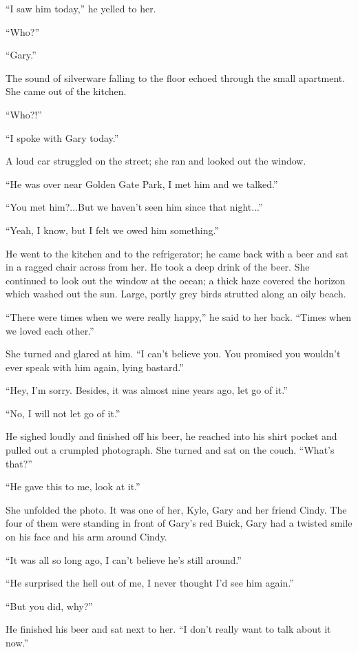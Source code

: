 \documentclass[
]{article}
\begin{document}
``I saw him today,'' he yelled to her.

``Who?''

``Gary.''

The sound of silverware falling to the floor echoed through the small
apartment. She came out of the kitchen.

``Who?!''

``I spoke with Gary today.''

A loud car struggled on the street; she ran and looked out the window.

``He was over near Golden Gate Park, I met him and we talked.''

``You met him?...But we haven't seen him since that night...''

``Yeah, I know, but I felt we owed him something.''

He went to the kitchen and to the refrigerator; he came back with a beer
and sat in a ragged chair across from her. He took a deep drink of the
beer. She continued to look out the window at the ocean; a thick haze
covered the horizon which washed out the sun. Large, portly grey birds
strutted along an oily beach.

``There were times when we were really happy,'' he said to her back.
``Times when we loved each other.''

She turned and glared at him. ``I can't believe you. You promised you
wouldn't ever speak with him again, lying bastard.''

``Hey, I'm sorry. Besides, it was almost nine years ago, let go of it.''

``No, I will not let go of it.''

He sighed loudly and finished off his beer, he reached into his shirt
pocket and pulled out a crumpled photograph. She turned and sat on the
couch. ``What's that?''

``He gave this to me, look at it.''

She unfolded the photo. It was one of her, Kyle, Gary and her friend
Cindy. The four of them were standing in front of Gary's red Buick, Gary
had a twisted smile on his face and his arm around Cindy.

``It was all so long ago, I can't believe he's still around.''

``He surprised the hell out of me, I never thought I'd see him again.''

``But you did, why?''

He finished his beer and sat next to her. ``I don't really want to talk
about it now.''
\end{document}
